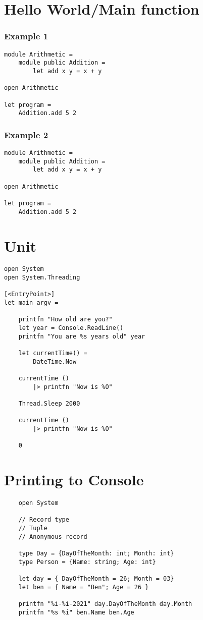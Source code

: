 \documentclass[a4paper,11pt]{article}
\begin{document}
\section{Hello World/Main function}
\subsubsection*{Example 1}
\begin{lstlisting}
module Arithmetic =
    module public Addition =
        let add x y = x + y

open Arithmetic

let program =
    Addition.add 5 2
\end{lstlisting}

\subsubsection*{Example 2}
\begin{lstlisting}
module Arithmetic =
    module public Addition =
        let add x y = x + y

open Arithmetic

let program =
    Addition.add 5 2
\end{lstlisting}

\section{Unit}
\begin{lstlisting}
open System
open System.Threading

[<EntryPoint>]
let main argv =

    printfn "How old are you?"
    let year = Console.ReadLine()
    printfn "You are %s years old" year

    let currentTime() =
        DateTime.Now

    currentTime ()
        |> printfn "Now is %O"

    Thread.Sleep 2000

    currentTime ()
        |> printfn "Now is %O"

    0
\end{lstlisting}

\section{Printing to Console}
\begin{lstlisting}
    open System

    // Record type
    // Tuple
    // Anonymous record
    
    type Day = {DayOfTheMonth: int; Month: int}
    type Person = {Name: string; Age: int}
    
    let day = { DayOfTheMonth = 26; Month = 03}
    let ben = { Name = "Ben"; Age = 26 }
    
    printfn "%i-%i-2021" day.DayOfTheMonth day.Month
    printfn "%s %i" ben.Name ben.Age    
\end{lstlisting}
\end{document}
